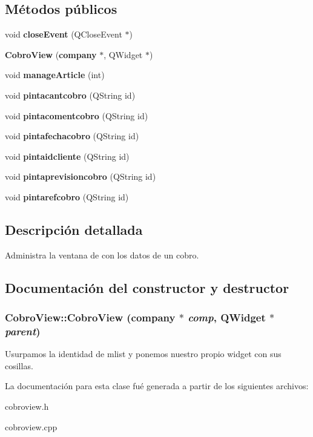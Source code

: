 \subsection*{M\'{e}todos p\'{u}blicos}
\begin{CompactItemize}
\item 
void {\bf close\-Event} (QClose\-Event $\ast$)\label{classCobroView_a0}

\item 
{\bf Cobro\-View} ({\bf company} $\ast$, QWidget $\ast$)
\item 
void {\bf manage\-Article} (int)\label{classCobroView_a2}

\item 
void {\bf pintacantcobro} (QString id)\label{classCobroView_a3}

\item 
void {\bf pintacomentcobro} (QString id)\label{classCobroView_a4}

\item 
void {\bf pintafechacobro} (QString id)\label{classCobroView_a5}

\item 
void {\bf pintaidcliente} (QString id)\label{classCobroView_a6}

\item 
void {\bf pintaprevisioncobro} (QString id)\label{classCobroView_a7}

\item 
void {\bf pintarefcobro} (QString id)\label{classCobroView_a8}

\end{CompactItemize}


\subsection{Descripci\'{o}n detallada}
Administra la ventana de con los datos de un cobro. 



\subsection{Documentaci\'{o}n del constructor y destructor}
\subsubsection{\setlength{\rightskip}{0pt plus 5cm}Cobro\-View::Cobro\-View ({\bf company} $\ast$ {\em comp}, QWidget $\ast$ {\em parent})}\label{classCobroView_a1}


Usurpamos la identidad de mlist y ponemos nuestro propio widget con sus cosillas. 

La documentaci\'{o}n para esta clase fu\'{e} generada a partir de los siguientes archivos:\begin{CompactItemize}
\item 
cobroview.h\item 
cobroview.cpp\end{CompactItemize}
